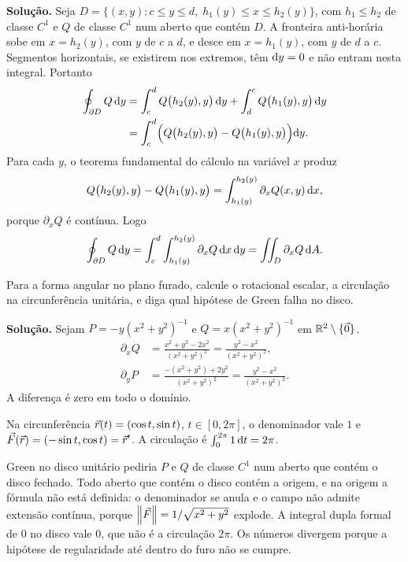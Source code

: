 \documentclass[11pt,a4paper]{article}
\begin{document}
\noindent\textbf{Solução.}
Seja $D=\{(x,y):c\le y\le d,\; h_1(y)\le x\le h_2(y)\}$, com $h_1\le h_2$ de classe $C^1$ e $Q$ de classe $C^1$ num aberto que contém $D$. A fronteira anti-horária sobe em $x=h_2(y)$, com $y$ de $c$ a $d$, e desce em $x=h_1(y)$, com $y$ de $d$ a $c$. Segmentos horizontais, se existirem nos extremos, têm $\mathrm{d} y=0$ e não entram nesta integral. Portanto
\begin{align*}
\oint_{\partial D} Q\,\mathrm{d} y
&=\int_c^d Q\bigl(h_2(y),y\bigr)\,\mathrm{d} y
+\int_d^c Q\bigl(h_1(y),y\bigr)\,\mathrm{d} y\\
&=\int_c^d\Bigl(Q\bigl(h_2(y),y\bigr)-Q\bigl(h_1(y),y\bigr)\Bigr)\mathrm{d} y.
\end{align*}
Para cada $y$, o teorema fundamental do cálculo na variável $x$ produz
\[
Q\bigl(h_2(y),y\bigr)-Q\bigl(h_1(y),y\bigr)
=\int_{h_1(y)}^{h_2(y)}\partial_x Q(x,y)\,\mathrm{d} x,
\]
porque $\partial_x Q$ é contínua. Logo
\[
\oint_{\partial D} Q\,\mathrm{d} y
=\int_c^d\int_{h_1(y)}^{h_2(y)}\partial_x Q\,\mathrm{d} x\,\mathrm{d} y
=\iint_D\partial_x Q\,\mathrm{d} A.
\]

\begin{exercicio}
Para a forma angular no plano furado, calcule o rotacional escalar, a circulação na circunferência unitária, e diga qual hipótese de Green falha no disco.
\end{exercicio}

\noindent\textbf{Solução.}
Sejam $P=-y(x^2+y^2)^{-1}$ e $Q=x(x^2+y^2)^{-1}$ em $\mathbb{R}^2\setminus\{\vec{0}\}$.
\begin{align*}
\partial_x Q
&=\frac{x^2+y^2-2x^2}{(x^2+y^2)^2}
=\frac{y^2-x^2}{(x^2+y^2)^2},\\
\partial_y P
&=\frac{-(x^2+y^2)+2y^2}{(x^2+y^2)^2}
=\frac{y^2-x^2}{(x^2+y^2)^2}.
\end{align*}
A diferença é zero em todo o domínio.

Na circunferência $\vec{r}(t)=(\cos t,\sin t)$, $t\in[0,2\pi]$, o denominador vale $1$ e $\vec{F}(\vec{r})=(-\sin t,\cos t)=\vec{r}'$. A circulação é $\int_0^{2\pi}1\,\mathrm{d} t=2\pi$.

Green no disco unitário pediria $P$ e $Q$ de classe $C^1$ num aberto que contém o disco fechado. Todo aberto que contém o disco contém a origem, e na origem a fórmula não está definida: o denominador se anula e o campo não admite extensão contínua, porque $\left\lVert \vec{F} \right\rVert=1/\sqrt{x^2+y^2}$ explode. A integral dupla formal de $0$ no disco vale $0$, que não é a circulação $2\pi$. Os números divergem porque a hipótese de regularidade até dentro do furo não se cumpre.
\end{document}
